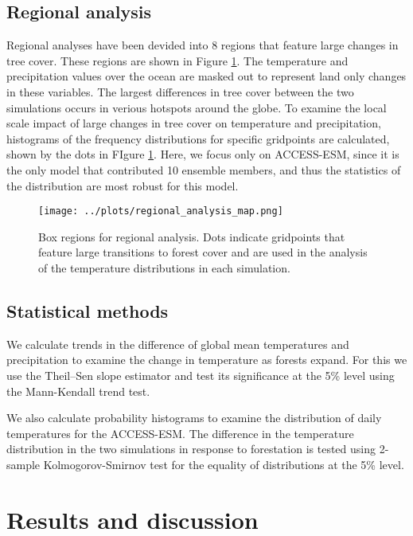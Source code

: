\documentclass[]{article}
\begin{document}
\subsection{Regional analysis}

Regional analyses have been devided into 8 regions that feature large changes in tree cover.
These regions are shown in Figure \ref{fig:box_regions}.
The temperature and precipitation values over the ocean are masked out to represent land only changes in these variables.
The largest differences in tree cover between the two simulations occurs in verious hotspots around the globe.
To examine the local scale impact of large changes in tree cover on temperature and precipitation, histograms of the frequency distributions for specific gridpoints are calculated, shown by the dots in FIgure \ref{fig:box_regions}.
Here, we focus only on ACCESS-ESM, since it is the only model that contributed 10 ensemble members, and thus the statistics of the distribution are most robust for this model.

\begin{figure}[H]
    \centering
    \texttt{[image: ../plots/regional\_analysis\_map.png]}
    \caption{Box regions for regional analysis. Dots indicate gridpoints that feature large transitions to forest cover and are used in the analysis of the temperature distributions in each simulation.}
    \label{fig:box_regions}
\end{figure}

\subsection{Statistical methods}

We calculate trends in the difference of global mean temperatures and precipitation to examine the change in temperature as forests expand.
For this we use the Theil–Sen slope estimator and test its significance at the 5\% level using the Mann-Kendall trend test.

We also calculate probability histograms to examine the distribution of daily temperatures for the ACCESS-ESM.
The difference in the temperature distribution in the two simulations in response to forestation is tested using 2-sample Kolmogorov-Smirnov test for the equality of distributions at the 5\% level.

\section{Results and discussion}
\end{document}
